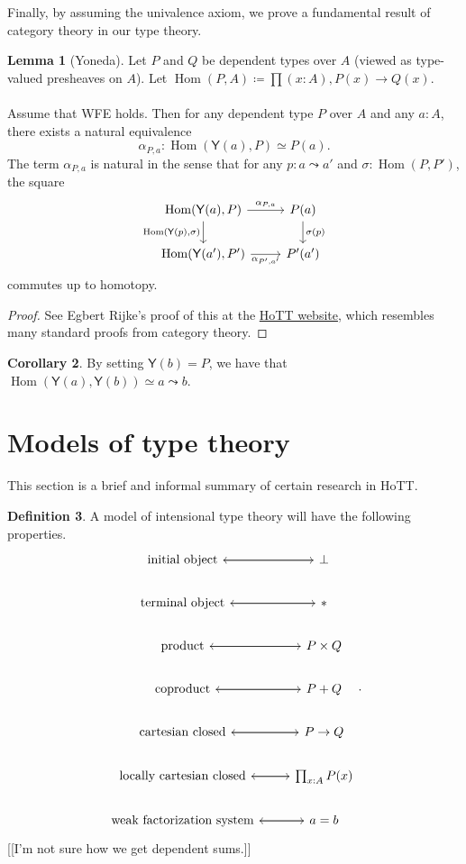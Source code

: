 \documentclass[10pt,letterpaper,cm]{nupset}
\theoremstyle{definition}
\newtheorem{definition}{Definition}[subsection]
\theoremstyle{theorem}
\newtheorem{lemma}[definition]{Lemma}
\newtheorem{corollary}[definition]{Corollary}
\theoremstyle{remark}
\newcommand{\1}{\mathbf{1}}
\newcommand{\0}{\vec 0}
\DeclareMathOperator{\Hom}{Hom}
\begin{document}
Finally, by assuming the univalence axiom, we prove a fundamental result of category theory in our type theory.

\begin{lemma}[Yoneda]
Let $P$ and $Q$ be dependent types over $A$ (viewed as type-valued presheaves on $A$). Let $\Hom(P, A) \coloneqq \prod(x:A), P(x) \to Q(x)$.
\\ \\
Assume that WFE holds. Then for any dependent type $P$ over $A$ and any $a: A$, there exists a natural equivalence $$ \alpha_{P,a} :\Hom(\mathsf{Y}(a), P)\simeq P(a) . $$ The term $ \alpha_{P,a} $ is natural in the sense that for any $p: a\leadsto a'$ and $\sigma : \Hom(P, P')$, the square
\[
\begin{tikzcd}
{\Hom(\mathsf{Y}(a), P)} \arrow[r, "{\alpha_{P,a}}"] \arrow[d, "{\Hom(\mathsf{Y}(p), \sigma)}"'] & P(a) \arrow[d, "\sigma(p)"] \\
{\Hom(\mathsf{Y}(a'), P')} \arrow[r, "{\alpha_{P', a'}}"'] & P'(a')
\end{tikzcd}\] commutes up to homotopy.
\end{lemma}
\begin{proof}
See Egbert Rijke's proof of this at the \href{https://homotopytypetheory.org/2012/05/02/a-type-theoretical-yoneda-lemma/}{HoTT website}, which resembles many standard proofs from category theory.
\end{proof}

\begin{corollary}
By setting $\mathsf{Y}(b) = P$, we have that $\Hom(\mathsf{Y}(a), \mathsf{Y}(b)) \simeq a \leadsto b$.
\end{corollary}

\section{Models of type theory}

This section is a brief and informal summary of certain research in HoTT.

\begin{definition}
A model of intensional type theory will have the following properties.
\[
\begin{tikzcd}
\text{initial object} \arrow[r] & \bot \arrow[l] \\
\text{terminal object} \arrow[r] & \ast \arrow[l] \\
\text{product} \arrow[r] & P\times Q \arrow[l] \\
\text{coproduct} \arrow[r] & P + Q \arrow[l] \\
\text{cartesian closed} \arrow[r] & P \to Q \arrow[l] \\
\text{locally cartesian closed} \arrow[r] & \prod_{x:A}P(x) \arrow[l] \\
\text{weak factorization system} \arrow[r] & a=b \arrow[l]
\end{tikzcd}
.\] {[[I'm not sure how we get dependent sums.]]}
\end{definition}
\end{document}
